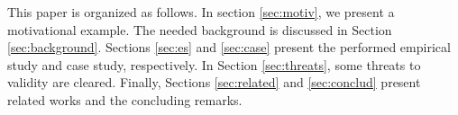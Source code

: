 This paper is organized as follows. In section \ref{sec:motiv}, we present a motivational example. The needed background is discussed in Section \ref{sec:background}. Sections \ref{sec:es} and \ref{sec:case} present the performed empirical study and case study, respectively. In Section \ref{sec:threats}, some threats to validity are cleared. Finally, Sections \ref{sec:related} and \ref{sec:conclud} present related works and the concluding remarks.